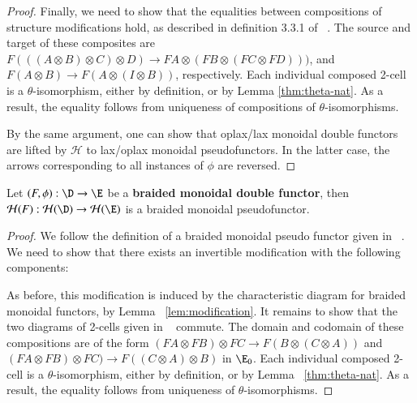 \begin{proof}
Finally, we need to show that the equalities between compositions of structure modifications hold, as described in definition 3.3.1 of ~\cite{nick:tricats}. The source and target of these composites are $F(((A \otimes B) \otimes C) \otimes D) \rightarrow FA \otimes ( FB \otimes (FC \otimes FD)))$, and $F(A \otimes B) \rightarrow F(A \otimes (I \otimes B))$, respectively.  Each individual composed 2-cell is a $\theta$-isomorphism, either by definition, or by Lemma \ref{thm:theta-nat}. As a result, the equality follows from uniqueness of compositions of $\theta$-isomorphisms.

By the same argument, one can show that oplax/lax monoidal double functors are lifted by $\mathcal{H}$ to lax/oplax monoidal pseudofunctors. In the latter case, the arrows corresponding to all instances of $\phi$ are reversed. 
\end{proof}


\begin{lem}\label{lem:brfun}
Let $(F, \phi) :\D \rightarrow \E$ be a {\bf braided monoidal double functor}, then $\cH(F):\cH(\D) \rightarrow \cH(\E)$ is a braided monoidal pseudofunctor. 
\end{lem}

\begin{proof}
We follow the definition of a braided monoidal pseudo functor given in ~\cite{mccrudden:bal-coalgb}.
We need to show that there exists an invertible modification with the following components:

 
As before, this modification is induced by the characteristic diagram for braided monoidal functors, by Lemma ~\ref{lem:modification}.
It remains to show that the two diagrams of 2-cells given  in ~\cite{mccrudden:bal-coalgb} commute. The domain and codomain of these compositions are of the form $(FA \otimes FB) \otimes FC  \rightarrow F(B \otimes (C \otimes A))$  and $(FA \otimes FB) \otimes FC) \rightarrow F((C \otimes A) \otimes B)$ in $\E_0$.
Each individual composed 2-cell is a $\theta$-isomorphism, either by definition, or by Lemma ~\ref{thm:theta-nat}. As a result, the equality follows from uniqueness of $\theta$-isomorphisms. 
\end{proof}

